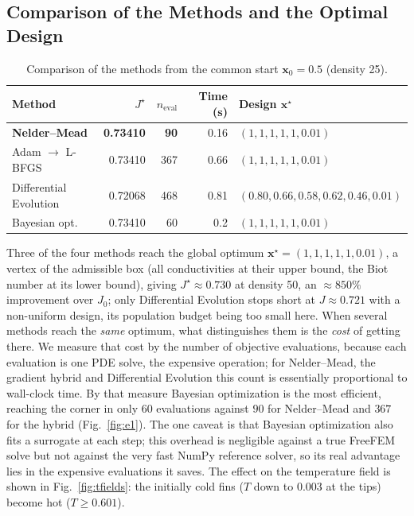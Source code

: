 \documentclass[11pt,a4paper]{article}
\begin{document}
\subsection{Comparison of the Methods and the Optimal Design}
\begin{table}[h]
\centering
\caption{Comparison of the methods from the common start $\mathbf{x}_0=0.5$ (density 25).}
\begin{tabular}{lrrrl}
\toprule
Method & $J^\star$ & $n_{\text{eval}}$ & Time (s) & Design $\mathbf{x}^\star$\\
\midrule
\textbf{Nelder--Mead} & \textbf{0.73410} & \textbf{90} & 0.16 & $(1,1,1,1,1,0.01)$\\
Adam $\rightarrow$ L-BFGS & 0.73410 & 367 & 0.66 & $(1,1,1,1,1,0.01)$\\
Differential Evolution & 0.72068 & 468 & 0.81 & $(0.80,0.66,0.58,0.62,0.46,0.01)$\\
Bayesian opt. & 0.73410 & 60 & 0.2 & $(1,1,1,1,1,0.01)$\\
\bottomrule
\end{tabular}
\end{table}

Three of the four methods reach the global optimum $\mathbf{x}^\star=(1,1,1,1,1,0.01)$, a vertex of
the admissible box (all conductivities at their upper bound, the Biot number at its lower bound), giving
$J^\star\approx0.730$ at density 50, an $\approx850\%$ improvement over $J_0$; only Differential Evolution
stops short at $J\approx0.721$ with a non-uniform design, its population budget being too small here.
When several methods reach the \emph{same} optimum, what distinguishes them is the \emph{cost} of getting
there. We measure that cost by the number of objective evaluations, because each evaluation is one PDE
solve, the expensive operation; for Nelder--Mead, the gradient hybrid and Differential Evolution this
count is essentially proportional to wall-clock time. By that measure Bayesian optimization is the most
efficient, reaching the corner in only $60$ evaluations against $90$ for Nelder--Mead and $367$ for the
hybrid (Fig.~\ref{fig:e1}). The one caveat is that Bayesian optimization also fits a surrogate at each
step; this overhead is negligible against a true FreeFEM solve but not against the very fast NumPy
reference solver, so its real advantage lies in the expensive evaluations it saves. The effect on the
temperature field is shown in Fig.~\ref{fig:tfields}: the initially cold fins ($T$ down to $0.003$ at the
tips) become hot ($T\ge0.601$).
\end{document}
